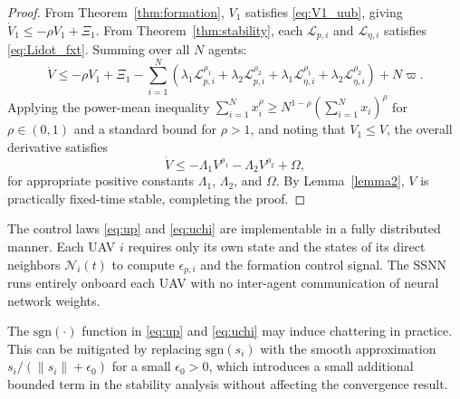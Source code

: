 \begin{proof}
From Theorem~\ref{thm:formation}, $V_1$ satisfies \eqref{eq:V1_uub}, giving
$\dot{V}_1 \leq -\rho V_1 + \Xi_1$.
From Theorem~\ref{thm:stability}, each $\mathcal{L}_{p,i}$ and $\mathcal{L}_{\eta,i}$
satisfies \eqref{eq:Lidot_fxt}. Summing over all $N$ agents:
\begin{equation}
    \dot{V} \leq -\rho V_1 + \Xi_1
    - \sum_{i=1}^{N} \left(
    \lambda_1 \mathcal{L}_{p,i}^{\rho_1} + \lambda_2 \mathcal{L}_{p,i}^{\rho_2}
    + \lambda_1 \mathcal{L}_{\eta,i}^{\rho_1} + \lambda_2 \mathcal{L}_{\eta,i}^{\rho_2}
    \right) + N \varpi.
\end{equation}
Applying the power-mean inequality $\sum_{i=1}^N x_i^{\rho} \geq
N^{1-\rho}(\sum_{i=1}^N x_i)^{\rho}$ for $\rho \in (0,1)$ and a standard bound
for $\rho > 1$, and noting that $V_1 \leq V$, the overall derivative satisfies
\begin{equation}
    \dot{V} \leq -\Lambda_1 V^{\rho_1} - \Lambda_2 V^{\rho_2} + \Omega,
    \label{eq:Vdot_full}
\end{equation}
for appropriate positive constants $\Lambda_1$, $\Lambda_2$, and $\Omega$. By
Lemma~\ref{lemma2}, $V$ is practically fixed-time stable, completing the proof.
\end{proof}

\begin{remark}
The control laws \eqref{eq:up} and \eqref{eq:uchi} are implementable in a fully
distributed manner. Each UAV $i$ requires only its own state and the states of
its direct neighbors $\mathcal{N}_i(t)$ to compute $\epsilon_{p,i}$ and the
formation control signal. The SSNN runs entirely onboard each UAV with no
inter-agent communication of neural network weights.
\end{remark}

\begin{remark}
The $\text{sgn}(\cdot)$ function in \eqref{eq:up} and \eqref{eq:uchi} may
induce chattering in practice. This can be mitigated by replacing
$\text{sgn}(s_i)$ with the smooth approximation $s_i / (\|s_i\| + \epsilon_0)$
for a small $\epsilon_0 > 0$, which introduces a small additional bounded term
in the stability analysis without affecting the convergence result.
\end{remark}

